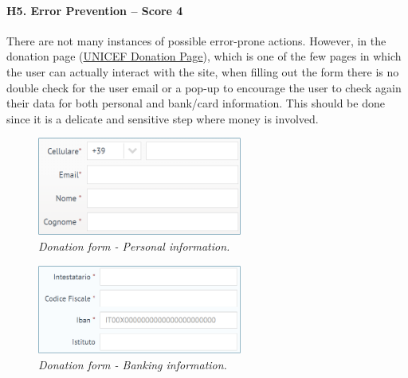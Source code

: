 \newpage

\paragraph*{H5. Error Prevention – Score 4}
There are not many instances of possible error-prone actions.
However, in the donation page (\href{https://donazioni.unicef.it/}{UNICEF Donation Page}), which is one of the few pages in which the user can actually interact with the site, when filling out the form there is no double check for the user email or a pop-up to encourage the user to check again their data for both personal and bank/card information. This should be done since it is a delicate and sensitive step where money is involved.
\begin{figure}[h]
	\centering
	\begin{center}
		\includegraphics[width=0.6\textwidth]{Picture8.png}
	\end{center}
	\captionsetup{font=small}
	\caption{\textit{Donation form - Personal information.}}
	\label{fig:label8}
\end{figure}
\begin{figure}[h]
	\centering
	\begin{center}
		\includegraphics[width=0.6\textwidth]{Picture9.png}
	\end{center}
	\captionsetup{font=small}
	\caption{\textit{Donation form - Banking information.}}
	\label{fig:label9}
\end{figure}

\newpage

